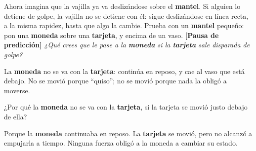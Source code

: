 \documentclass[
  spanish,
  letterpaper,
  12pt,
  oneside,
  open=any,
  DIV=15]{scrbook}
\begin{document}
Ahora imagina que la vajilla ya va deslizándose sobre el
\textcolor[HTML]{2563EB}{\textbf{mantel}}. Si alguien lo detiene de
golpe, la vajilla no se detiene con él: sigue deslizándose en línea
recta, a la misma rapidez, hasta que algo la cambie. Prueba con un
\textcolor[HTML]{2563EB}{\textbf{mantel}} pequeño: pon una
\textcolor[HTML]{7C3AED}{\textbf{moneda}} sobre una
\textcolor[HTML]{2563EB}{\textbf{tarjeta}}, y encima de un vaso.
\textbf{{[}Pausa de predicción{]}} \emph{¿Qué crees que le pase a la
\textcolor[HTML]{7C3AED}{\textbf{moneda}} si la
\textcolor[HTML]{2563EB}{\textbf{tarjeta}} sale disparada de golpe?}

La \textcolor[HTML]{7C3AED}{\textbf{moneda}} no se va con la
\textcolor[HTML]{2563EB}{\textbf{tarjeta}}: continúa en reposo, y cae al
vaso que está debajo. No se movió porque ``quiso''; no se movió porque
nada la obligó a moverse.

\begin{tcolorbox}[enhanced jigsaw, arc=.35mm, bottomrule=.15mm, bottomtitle=1mm, breakable, colback=white, colbacktitle=quarto-callout-warning-color!10!white, colframe=quarto-callout-warning-color-frame, coltitle=black, left=2mm, leftrule=.75mm, opacityback=0, opacitybacktitle=0.6, rightrule=.15mm, title=\textcolor{quarto-callout-warning-color}{\faExclamationTriangle}\hspace{0.5em}{Pregunta de comprensión}, titlerule=0mm, toprule=.15mm, toptitle=1mm]

¿Por qué la \textcolor[HTML]{7C3AED}{\textbf{moneda}} no se va con la
\textcolor[HTML]{2563EB}{\textbf{tarjeta}}, si la tarjeta se movió justo
debajo de ella?

\end{tcolorbox}

\begin{tcolorbox}[enhanced jigsaw, arc=.35mm, bottomrule=.15mm, bottomtitle=1mm, breakable, colback=white, colbacktitle=quarto-callout-tip-color!10!white, colframe=quarto-callout-tip-color-frame, coltitle=black, left=2mm, leftrule=.75mm, opacityback=0, opacitybacktitle=0.6, rightrule=.15mm, title=\textcolor{quarto-callout-tip-color}{\faLightbulb}\hspace{0.5em}{Apoyo Procedimental (Comprobación)}, titlerule=0mm, toprule=.15mm, toptitle=1mm]

Porque la \textcolor[HTML]{7C3AED}{\textbf{moneda}} continuaba en
reposo. La \textcolor[HTML]{2563EB}{\textbf{tarjeta}} se movió, pero no
alcanzó a empujarla a tiempo. Ninguna fuerza obligó a la moneda a
cambiar su estado.

\end{tcolorbox}
\end{document}
